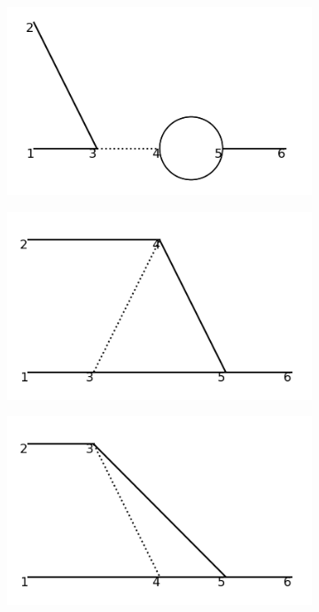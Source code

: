 \documentclass[11pt,a4paper,twoside,pdf]{article}
\numberwithin{equation}{section}
\begin{document}
\begin{figure}[h!]
\begin{subfigure}[t]{0.24\textwidth}
        \caption{ }
    \end{subfigure}
    \hfill
    \begin{subfigure}[t]{0.24\textwidth}
        \centering
        \includegraphics[width=\textwidth]{plots/order3/order3_1to2/4.png}
        \caption{ }
    \end{subfigure}
    \hfill
    \begin{subfigure}[t]{0.24\textwidth}
        \centering
        \includegraphics[width=\textwidth]{plots/order3/order3_1to2/5.png}
        \caption{ }
        \label{fig:order3_1to2/5}
    \end{subfigure}
    \hfill  
    \begin{subfigure}[t]{0.24\textwidth}
        \centering
        \includegraphics[width=\textwidth]{plots/order3/order3_1to2/6.png}

\end{subfigure}
\end{figure}
\end{document}
